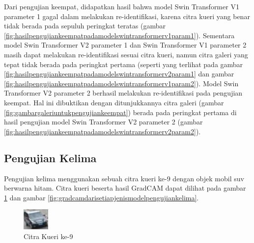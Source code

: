 Dari pengujian keempat, didapatkan hasil bahwa model Swin Transformer V1 parameter 1 gagal dalam melakukan re-identifikasi, 
karena citra kueri yang benar tidak berada pada sepuluh peringkat teratas (gambar 
\ref{fig:hasilpengujiankeempatpadamodelswintransformerv1param1}). Sementara model Swin Transformer V2 parameter 1 dan 
Swin Transformer V1 parameter 2 masih dapat melakukan re-identifikasi sesuai citra kueri, namun citra galeri yang tepat 
tidak berada pada peringkat pertama (seperti yang terlihat pada gambar \ref{fig:hasilpengujiankeempatpadamodelswintransformerv2param1} 
dan gambar \ref{fig:hasilpengujiankeempatpadamodelswintransformerv1param2}). Model Swin Transformer V2 parameter 2 berhasil 
melakukan re-identifikasi pada pengujian keempat. Hal ini dibuktikan dengan ditunjukkannya citra galeri 
(gambar \ref{fig:gambargaleriuntukpengujiankeempat}) berada pada peringkat pertama di hasil pengujian model Swin Transformer 
V2 parameter 2 (gambar \ref{fig:hasilpengujiankeempatpadamodelswintransformerv2param2}).\\

\subsection{Pengujian Kelima}

Pengujian kelima menggunakan sebuah citra kueri ke-9 dengan objek mobil suv berwarna hitam. Citra kueri 
beserta hasil GradCAM dapat dilihat pada gambar \ref{fig:gambarkueriuntukpengujiankelima} dan gambar 
\ref{fig:gradcamdarisetiapjenismodelpengujiankelima}.

\begin{figure}[h!]
  \centering
  \includegraphics[scale=2]{gambar/Que9_1019.jpg}
  \caption{Citra Kueri ke-9}
  \label{fig:gambarkueriuntukpengujiankelima}
\end{figure}

